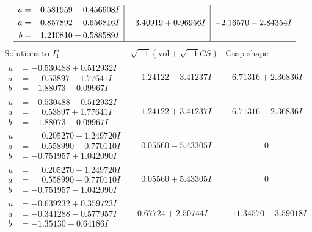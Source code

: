 \documentclass[1p]{elsarticle_modified}
\theoremstyle{definition}
\newcommand{\I}{\sqrt{-1}}
\begin{document}
$$\begin{array}{c|c|c}
\begin{aligned}
u &= \phantom{-}0.581959 - 0.456608 I \\
a &= -0.857892 + 0.656816 I \\
b &= \phantom{-}1.210810 + 0.588589 I\end{aligned}
 & \phantom{-}3.40919 + 0.96956 I & -2.16570 - 2.84354 I\\
 \hline 
 \end{array}$$\newpage$$\begin{array}{c|c|c}  
\text{Solutions to }I^u_{1}& \I (\text{vol} + \sqrt{-1}CS) & \text{Cusp shape}\\
 \hline 
\begin{aligned}
u &= -0.530488 + 0.512932 I \\
a &= \phantom{-}0.53897 - 1.77641 I \\
b &= -1.88073 + 0.09967 I\end{aligned}
 & \phantom{-}1.24122 - 3.41237 I & -6.71316 + 2.36836 I \\ \hline\begin{aligned}
u &= -0.530488 - 0.512932 I \\
a &= \phantom{-}0.53897 + 1.77641 I \\
b &= -1.88073 - 0.09967 I\end{aligned}
 & \phantom{-}1.24122 + 3.41237 I & -6.71316 - 2.36836 I \\ \hline\begin{aligned}
u &= \phantom{-}0.205270 + 1.249720 I \\
a &= \phantom{-}0.558990 - 0.770110 I \\
b &= -0.751957 + 1.042090 I\end{aligned}
 & \phantom{-}0.05560 - 5.43305 I & \phantom{-0.000000 } 0 \\ \hline\begin{aligned}
u &= \phantom{-}0.205270 - 1.249720 I \\
a &= \phantom{-}0.558990 + 0.770110 I \\
b &= -0.751957 - 1.042090 I\end{aligned}
 & \phantom{-}0.05560 + 5.43305 I & \phantom{-0.000000 } 0 \\ \hline\begin{aligned}
u &= -0.639232 + 0.359723 I \\
a &= -0.341288 - 0.577957 I \\
b &= -1.35130 + 0.64186 I\end{aligned}
 & -0.67724 + 2.50744 I & -11.34570 - 3.59018 I \\ \hline\begin{aligned}

\end{aligned}
\end{array}$$
\end{document}
